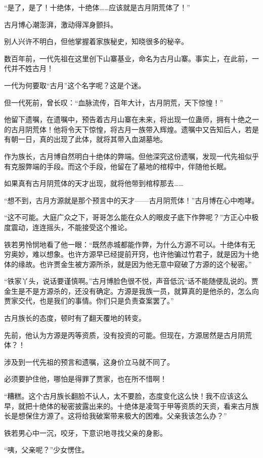 \begin{this_body}
“是了，是了！十绝体，十绝体……应该就是古月阴荒体了！”

古月博心潮澎湃，激动得浑身颤抖。

别人兴许不明白，但他掌握着家族秘史，知晓很多的秘辛。

数百年前，一代先祖在这里创下山寨基业，命名为古月山寨。事实上，在此前，一代并不姓古月！

一代为何要取“古月”这个名字呢？这是个迷。

但一代死前，曾长叹：“血脉流传，百年大计，古月阴荒，天下惊惶！”

他留下遗嘱，在遗嘱中，预告着古月山寨在未来，将出现一位蛊师，拥有十绝之一的古月阴荒体！他将令天下惊惶，将古月一族带入辉煌。遗嘱中又告知后人，若是有朝一日，真的出现了此体，就将其带入血湖墓地。

作为族长，古月博自然明白十绝体的弊端。但他深究这份遗嘱，发现一代先祖似乎有克服弊端的手段。而这个手段，他留在了墓地的棺椁中，伴随他长眠。

如果真有古月阴荒体的天才出现，就将他带到棺椁那去……

“想不到，古月方源就是那个预言中的天才——古月阴荒体！”古月博在心中咆哮。

“这不可能。大庭广众之下，哥哥怎么能在众人的眼皮子底下作弊呢？”方正心中极度震动，连连摇头，不能接受这个推论。

铁若男怜悯地看了他一眼：“既然赤城都能作弊，为什么方源不可以。十绝体有无穷奥妙，难以想象。也许方源早已经提前开窍，也许他骗过竹君子，就是因为十绝体的缘故。也许贾金生被方源所杀，就是因为他无意中窥破了方源的这个秘密。”

“铁家丫头，说话要谨慎啊。”古月博脸色很不悦，声音低沉“话不能随便乱说的。贾金生是不是方源杀的，还没有确定。方源是我族一员，就算真的是他杀的，怎么向贾家交代，也是我们的事情。你们只是负责查案罢了。”

古月族长的态度，顿时有了翻天覆地的转变。

先前，他认为方源是丙等资质，没有投资的可能。但现在，方源居然是古月阴荒体？！

涉及到一代先祖的预言和遗嘱，这身价立马就不同了。

必须要护住他，哪怕是得罪了贾家，也在所不惜啊！

“糟糕。这个古月族长翻脸不认人，太不要脸，态度变化这么快！我不应该这么早，就把十绝体的秘密披露出来的。十绝体是凌驾于甲等资质的天资，看来古月族长是想保住方源了。这将给我破案带来极大的困难。父亲我该怎么办？”

铁若男心中一沉，咬牙，下意识地寻找父亲的身影。

“咦，父亲呢？”少女愣住。


\end{this_body}
